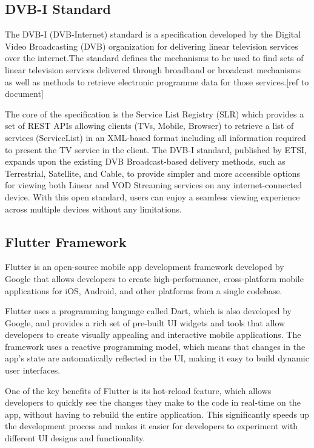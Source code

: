 \documentclass[conference]{IEEEtran}
\begin{document}
\subsection{DVB-I Standard}

The DVB-I (DVB-Internet) standard is a specification developed by the Digital Video Broadcasting (DVB) organization for delivering linear television services over the internet.The standard defines the mechanisms to be used to find sets of linear television services delivered through broadband or broadcast mechanisms as well as methods to retrieve electronic programme data for those services.[ref to document]

The core of the specification is the Service List Registry (SLR) which provides a set of REST APIs allowing clients (TVs, Mobile, Browser) to retrieve a list of services (ServiceList) in an XML-based format including all information required to present the TV service in the client. The DVB-I standard, published by ETSI, expands upon the existing DVB Broadcast-based delivery methods, such as Terrestrial, Satellite, and Cable, to provide simpler and more accessible options for viewing both Linear and VOD Streaming services on any internet-connected device. With this open standard, users can enjoy a seamless viewing experience across multiple devices without any limitations.





\subsection{Flutter Framework}\label{AA}


Flutter is an open-source mobile app development framework developed by Google that allows developers to create high-performance, cross-platform mobile applications for iOS, Android, and other platforms from a single codebase.

Flutter uses a programming language called Dart, which is also developed by Google, and provides a rich set of pre-built UI widgets and tools that allow developers to create visually appealing and interactive mobile applications. The framework uses a reactive programming model, which means that changes in the app's state are automatically reflected in the UI, making it easy to build dynamic user interfaces.

One of the key benefits of Flutter is its hot-reload feature, which allows developers to quickly see the changes they make to the code in real-time on the app, without having to rebuild the entire application. This significantly speeds up the development process and makes it easier for developers to experiment with different UI designs and functionality.
\end{document}
